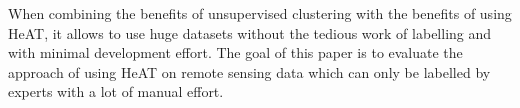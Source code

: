 When combining the benefits of unsupervised clustering with the benefits of using \gls{HeAT}, it allows to use huge datasets without the tedious work of labelling and with minimal development effort.
The goal of this paper is to evaluate the approach of using \gls{HeAT} on remote sensing data which can only be labelled by experts with a lot of manual effort.
